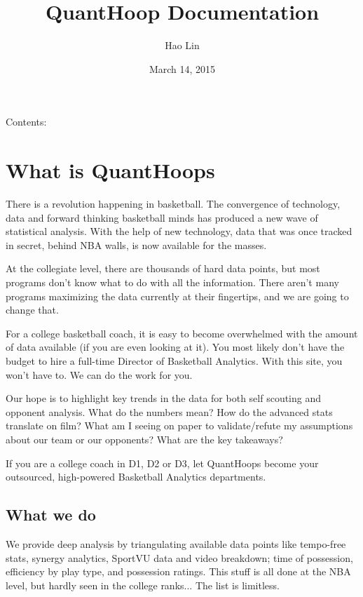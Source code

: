 \documentclass[letterpaper,10pt,english]{sphinxmanual}
\title{QuantHoop Documentation}
\date{March 14, 2015}
\author{Hao Lin}
\begin{document}
\maketitle
\tableofcontents
{}\label{index::doc}


Contents:


\chapter{What is QuantHoops}
\label{_static/basic:what-is-quanthoops}\label{_static/basic::doc}\label{_static/basic:welcome-to-quanthoop-s-documentation}
There is a revolution happening in basketball. The convergence of technology,
data and forward thinking basketball minds has produced a new wave of statistical
analysis. With the help of new technology, data that was once tracked in secret,
behind NBA walls, is now available for the masses.

At the collegiate level, there are thousands of hard data points, but most programs
don't know what to do with all the information. There aren't many programs
maximizing the data currently at their fingertips, and we are going to change that.

For a college basketball coach, it is easy to become overwhelmed with the amount
of data available (if you are even looking at it). You most likely don't have
the budget to hire a full-time Director of Basketball Analytics. With this
site, you won't have to. We can do the work for you.

Our hope is to highlight key trends in the data for both self scouting and
opponent analysis. What do the numbers mean? How do the advanced stats translate
on film? What am I seeing on paper to validate/refute my assumptions about our
team or our opponents? What are the key takeaways?

If you are a college coach in D1, D2 or D3, let QuantHoops become your outsourced,
high-powered Basketball Analytics departments.


\section{What we do}
\label{_static/basic:what-we-do}
We provide deep analysis by triangulating available data points like tempo-free
stats, synergy analytics, SportVU data and video breakdown; time of possession,
efficiency by play type, and possession ratings. This stuff is all done at the
NBA level, but hardly seen in the college ranks... The list is limitless.
\end{document}
